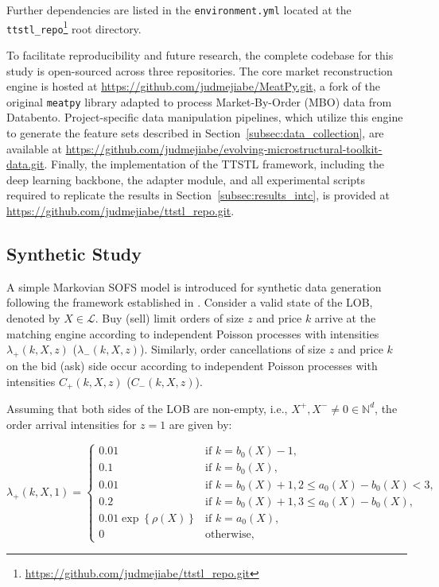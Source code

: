 \documentclass[10pt,a4paper,oneside]{article}
\newcommand{\Bo}{\mathcal{L}}
\begin{document}
Further dependencies are listed in the \verb|environment.yml| located at the \verb|ttstl_repo|\footnote{\url{https://github.com/judmejiabe/ttstl_repo.git}} root directory.

To facilitate reproducibility and future research, the complete codebase for this study is open-sourced across three repositories. The core market reconstruction engine is hosted at \url{https://github.com/judmejiabe/MeatPy.git}, a fork of the original \verb|meatpy| library adapted to process Market-By-Order (MBO) data from Databento. Project-specific data manipulation pipelines, which utilize this engine to generate the feature sets described in Section~\ref{subsec:data_collection}, are available at \url{https://github.com/judmejiabe/evolving-microstructural-toolkit-data.git}. Finally, the implementation of the TTSTL framework, including the deep learning backbone, the adapter module, and all experimental scripts required to replicate the results in Section~\ref{subsec:results_intc}, is provided at \url{https://github.com/judmejiabe/ttstl_repo.git}.

\subsection{Synthetic Study}
\label{subsec:synthetic_study}

A simple Markovian SOFS model is introduced for synthetic data generation following the framework established in \cite{cont2023mathematical}. Consider a valid state of the LOB, denoted by $X \in \Bo$. Buy (sell) limit orders of size $z$ and price $k$ arrive at the matching engine according to independent Poisson processes with intensities $\lambda_{+}(k, X, z)$ ($\lambda_{-}(k, X, z)$). Similarly, order cancellations of size $z$ and price $k$ on the bid (ask) side occur according to independent Poisson processes with intensities $C_+(k, X, z)$ ($C_-(k, X, z)$).

Assuming that both sides of the LOB are non-empty, i.e., $X^+, X^- \neq 0 \in \mathbb{N}^d$, the order arrival intensities for $z=1$ are given by:

\[
    \lambda_+(k, X, 1) =
    \begin{cases}
        0.01                               & \text{if } k = b_0(X) - 1,                             \\
        0.1                                & \text{if } k = b_0(X),                                 \\
        0.01                               & \text{if } k = b_0(X) + 1, 2 \leq a_0(X) - b_0(X) < 3, \\
        0.2                                & \text{if } k = b_0(X) + 1, 3 \leq a_0(X) - b_0(X),     \\
        0.01 \exp \left\{ \rho(X) \right\} & \text{if } k = a_0(X),                                 \\
        0                                  & \text{otherwise,}
    \end{cases}
\]
\end{document}
